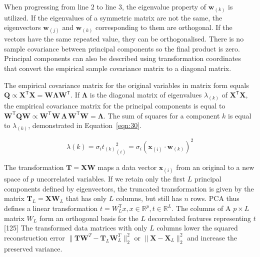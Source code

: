 \documentclass[preprint,12pt]{elsarticle}
\begin{document}
When progressing from line $2$ to line $3$, the eigenvalue property of $\mathbf{w}_{\left(k\right)}$ is utilized. If the eigenvalues of a symmetric matrix are not the same, the eigenvectors $\mathbf{w}_{\left(j\right)}$ and $\mathbf{w}_{\left(k\right)}$ corresponding to them are orthogonal. If the vectors have the same repeated value, they can be orthogonalised. There is no sample covariance between principal components so the final product is zero. Principal components can also be described using transformation coordinates that convert the empirical sample covariance matrix to a diagonal matrix.

The empirical covariance matrix for the original variables in matrix form equals $\mathbf{Q} \propto \mathbf{X}^{\mathsf{T}}\mathbf{X} =\mathbf{W} \mathbf{\Lambda} \mathbf{W}^{\mathsf{T}}$. If $\mathbf{\Lambda}$ is the diagonal matrix of eigenvalues $\lambda_{\left(k\right)}$ of $\mathbf{X}^{\mathsf{T}}\mathbf{X}$, the empirical covariance matrix for the principal components is equal to $\mathbf{W}^{\mathsf{T}}\mathbf{Q} \mathbf{W} \propto \mathbf{W}^{\mathsf{T}}\mathbf{W} \,\mathbf{\Lambda} \,\mathbf{W}^{\mathsf{T}}\mathbf{W} =\mathbf{\Lambda}$. The sum of squares for a component $k$ is equal to $\lambda_{\left(k\right)}$, demonstrated in Equation~\ref{eqn:30}.

\begin{equation}
	\lambda(k) = \sigma_{i} {t_{\left(k\right)}}^{2}_{\left(i\right)} = \sigma_{i} {\left(\mathbf{x}_{\left(i\right)} \cdot \mathbf{w}_{\left(k\right)}\right)}^{2}
	\label{eqn:30}
\end{equation}

The transformation $\mathbf{T} = \mathbf{X} \mathbf{W}$ maps a data vector $\mathbf{x}_{\left(i\right)}$ from an original to a new space of $p$ uncorrelated variables. If we retain only the first $L$ principal components defined by eigenvectors, the truncated transformation is given by the matrix $\mathbf{T}_{L}=\mathbf{X} \mathbf{W}_{L}$ that has only $L$ columns, but still has $n$ rows. PCA thus defines a linear transformation $t=W_{L}^{\mathsf{T}}x,x\in \mathbb{R}^{p},t\in \mathbb{R}^{L}$. The columns of A $p \times L$ matrix $W_{L}$ form an orthogonal basis for the $L$ decorrelated features representing $t$ [125] The transformed data matrices with only $L$ columns lower the squared reconstruction error $\|\mathbf{T} \mathbf{W}^{T}-\mathbf{T}_{L}\mathbf{W}_{L}^{T}\|_{2}^{2}$ or  $\|\mathbf{X} -\mathbf{X}_{L}\|_{2}^{2}$ and increase the preserved variance.
\end{document}
